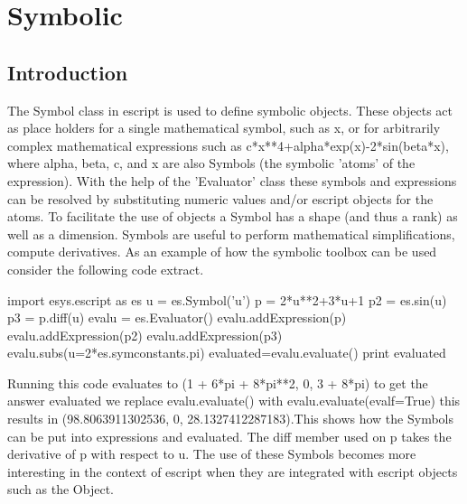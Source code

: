 \chapter{Symbolic}
\label{CHAP: Symbolic}
\section{Introduction}
The Symbol class in escript is used to define symbolic objects. These objects act as place holders for a single mathematical symbol, 
such as x, or for arbitrarily complex mathematical expressions such as
c*x**4+alpha*exp(x)-2*sin(beta*x), where alpha, beta, c, and x
are also Symbols (the symbolic 'atoms' of the expression).
With the help of the 'Evaluator' class these symbols and expressions can
be resolved by substituting numeric values and/or escript \Data objects
for the atoms. To facilitate the use of \Data objects a Symbol has a
shape (and thus a rank) as well as a dimension.
Symbols are useful to perform mathematical simplifications, compute
derivatives. As an example of how the symbolic toolbox can be used consider the following code extract.
\begin{python}
import esys.escript as es
u = es.Symbol('u')
p = 2*u**2+3*u+1
p2 = es.sin(u)
p3 = p.diff(u)
evalu = es.Evaluator()
evalu.addExpression(p)
evalu.addExpression(p2)
evalu.addExpression(p3)
evalu.subs(u=2*es.symconstants.pi)
evaluated=evalu.evaluate()
print evaluated
\end{python}
Running this code evaluates to (1 + 6*pi + 8*pi**2, 0, 3 + 8*pi) to get the answer evaluated we replace evalu.evaluate() with evalu.evaluate(evalf=True) this results in (98.8063911302536, 0, 28.1327412287183).This shows how the Symbols can be put into expressions and evaluated. The diff member used on p takes the derivative of p with respect to u. The use of these Symbols becomes more interesting in the context of escript when they are integrated with escript objects such as the \Data Object. 
